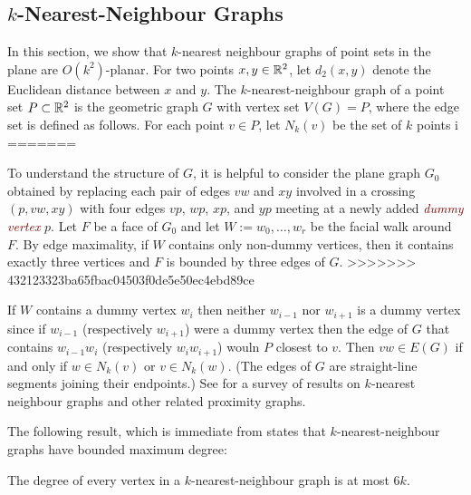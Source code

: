 \documentclass{patmorin}
\newcommand{\defin}[1]{\textcolor{Maroon}{\emph{#1}}}
\begin{document}
\subsection{$k$-Nearest-Neighbour Graphs}

In this section, we show that $k$-nearest neighbour graphs of point sets in the plane are $O(k^2)$-planar.  For two points $x,y\in\mathbb{R}^2$, let $d_2(x,y)$ denote the Euclidean distance between $x$ and $y$. The $k$-nearest-neighbour graph of a point set $P\subset\mathbb{R}^2$ is the geometric graph $G$ with vertex set $V(G)=P$, where the edge set is defined as follows. For each point $v\in P$, let $N_k(v)$ be the set of $k$ points i
=======

To understand the structure of $G$, it is helpful to consider the plane graph $G_0$ obtained by replacing each pair of edges $vw$ and $xy$ involved in a crossing $(p,vw,xy)$ with four edges $vp$, $wp$, $xp$, and $yp$ meeting at a newly added \defin{dummy vertex} $p$. Let $F$ be a face of $G_0$ and let $W:=w_0,\ldots,w_r$ be the facial walk around $F$. By edge maximality, if $W$ contains only non-dummy vertices, then it contains exactly three vertices and $F$ is bounded by three edges of $G$.
>>>>>>> 432123323ba65fbac04503f0de5e50ec4ebd89ce

If $W$ contains a dummy vertex $w_i$ then neither $w_{i-1}$ nor $w_{i+1}$ is a dummy vertex since if $w_{i-1}$ (respectively $w_{i+1}$) were a dummy vertex then the edge of $G$ that contains $w_{i-1}w_i$ (respectively $w_iw_{i+1}$) wouln $P$ closest to $v$. Then $vw\in E(G)$ if and only if $w\in N_k(v)$ or $v\in N_k(w)$. (The edges of $G$ are straight-line segments joining their endpoints.) See \citep{ProximityGraphs} for a survey of results on $k$-nearest neighbour graphs and other related proximity graphs.

The following result, which is immediate from \citet[Corollary~4.2.6]{abrego.munroy.ea:on} states that $k$-nearest-neighbour graphs have bounded maximum degree:
\begin{lem}
\label{k-nn-max-degree}
The degree of every vertex in a $k$-nearest-neighbour graph is at most $6k$.
\end{lem}
\end{document}
